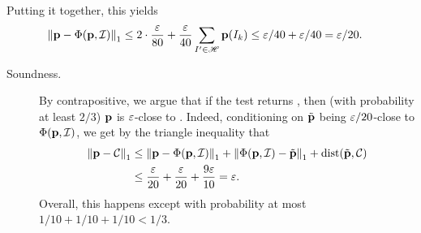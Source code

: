 Putting it together, this yields
\begin{align*}
  {\lVert\ensuremath{\mathbf{p}}-\Phi(\ensuremath{\mathbf{p}},\mathcal{I}){\rVert}}_1 
  &\leq 2\cdot \frac{\varepsilon}{80} + \frac{\varepsilon}{40} \sum_{ I^\prime \in \mathscr{H} } \mathbf{p}(I_k) \leq \varepsilon/40+\varepsilon/40 = \varepsilon/20.
\end{align*}

\begin{description}
  \item[Soundness.] By contrapositive, we argue that if the test returns \accept, then (with probability at least $2/3$) $\mathbf{p}$ is $\varepsilon$-close to \class. Indeed, conditioning on $\tilde{\mathbf{p}}$ being $\varepsilon/20$-close to $\Phi(\mathbf{p},\mathcal{I})$, we get by the triangle inequality that 
  \begin{align*}
      \normone{\D-\class} &\leq \normone{\D-\Phi(\D,\mathcal{I})} + \normone{\Phi(\D,\mathcal{I}) - \tilde{\D}} + \dist{\tilde{\D}}{\class} \\
      &\leq \frac{\eps}{20} + \frac{\eps}{20}+\frac{9\eps}{10} = \eps.
  \end{align*}
  Overall, this happens except with probability at most $1/10+1/10+1/10 < 1/3$.
  

\end{description}
